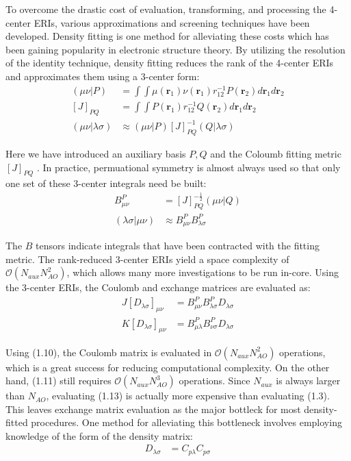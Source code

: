 To overcome the drastic cost of evaluation, transforming, and processing the 4-center ERIs, various approximations 
and screening techniques have been developed.  
Density fitting is one method for alleviating these costs which has been gaining popularity in electronic structure theory.
By utilizing the resolution of the identity technique, 
density fitting reduces the rank of the 4-center ERIs and approximates them using a 3-center form: 
\begin{align} 
(\mu \nu|P) &= \int \int \mu(\textbf{r}_{1}) 
\nu(\textbf{r}_{1}) r^{-1}_{12} P(\textbf{r}_{2}) d\textbf{r}_{1} d\textbf{r}_{2} \\
[J]_{PQ} &= \int \int P(\textbf{r}_1)r_{12}^{-1}Q(\textbf{r}_2) d{\textbf{r}_{1}}d{\textbf{r}_{2}} \\
(\mu \nu|\lambda \sigma) &\approx (\mu \nu| P)[J]_{PQ}^{-1}(Q|\lambda \sigma)  
\end{align} 

\noindent Here we have introduced an auxiliary basis $P, Q$ and the Coloumb fitting metric $[J]_{PQ}$ \cite{ref2}. 
In practice, permuational symmetry is almost always used so that only one set of these 3-center integrals need be built:
\begin{align} 
B_{\mu \nu}^P &= [J]_{PQ}^{-\frac{1}{2}}(\mu \nu | Q)  \\ 
(\lambda \sigma | \mu \nu) &\approx  B_{\mu \nu}^P B_{\lambda \sigma}^P  \end{align} 

\noindent The $B$ tensors indicate integrals that have been contracted with the fitting metric.
The rank-reduced 3-center ERIs yield a space complexity of $\mathcal{O}(N_{aux}N_{AO}^2)$, 
which allows many more investigations to be run in-core.  
Using the 3-center ERIs, the Coulomb and exchange matrices are evaluated as: 
\begin{align}
J[D_{\lambda \sigma}]_{\mu \nu} &= B_{\mu \nu}^P B_{\lambda \sigma}^PD_{\lambda \sigma} \\
K[D_{\lambda \sigma}]_{\mu \nu} &= B_{\mu \lambda}^P B_{\nu \sigma}^PD_{\lambda \sigma}
\end{align}

\noindent Using (1.10), the Coulomb matrix is evaluated in $\mathcal{O}(N_{aux}N_{AO}^2)$ operations, which is a great success
for reducing computational complexity. On the other hand, (1.11) still requires $\mathcal{O}(N_{aux}N_{AO}^3)$ operations. 
Since $N_{aux}$ is always larger than $N_{AO}$, evaluating (1.13) is actually more expensive than evaluating (1.3).
This leaves exchange matrix evaluation as the major bottleck for most density-fitted procedures.
One method for alleviating this bottleneck involves employing knowledge 
of the form of the density matrix:
\begin{align}
D_{\lambda \sigma} &= C_{p\lambda}C_{p\sigma} 
\end{align}

